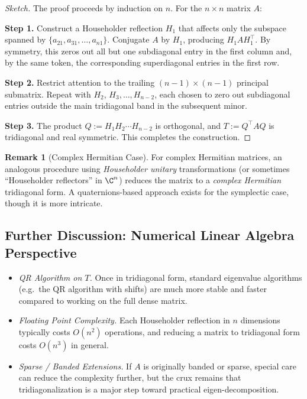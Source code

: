 \documentclass[letterpaper,11pt,oneside,reqno]{article}
\numberwithin{equation}{section}
\theoremstyle{definition}
\newtheorem{remark}[proposition]{Remark}
\begin{document}
\begin{proof}[Sketch]
The proof proceeds by induction on $n$. For the $n\times n$ matrix $A$:

\noindent
{\bf Step 1.} Construct a Householder reflection $H_1$ that affects only the subspace spanned by $\{a_{21},a_{31},\dots,a_{n1}\}$. Conjugate $A$ by $H_1$, producing $H_1 A H_1^\top$. By symmetry, this zeros out all but one subdiagonal entry in the first column and, by the same token, the corresponding superdiagonal entries in the first row.

\noindent
{\bf Step 2.} Restrict attention to the trailing $(n-1)\times(n-1)$ principal submatrix. Repeat with $H_2$, $H_3,\dots,H_{n-2}$, each chosen to zero out subdiagonal entries outside the main tridiagonal band in the subsequent minor.

\noindent
{\bf Step 3.} The product $Q := H_1 H_2 \cdots H_{n-2}$ is orthogonal, and $T := Q^\top A Q$ is tridiagonal and real symmetric. This completes the construction.
\end{proof}

\begin{remark}[Complex Hermitian Case]
For complex Hermitian matrices, an analogous procedure using \emph{Householder unitary} transformations (or sometimes “Householder reflectors” in $\C^n$) reduces the matrix to a \emph{complex Hermitian} tridiagonal form. A quaternions-based approach exists for the symplectic case, though it is more intricate.
\end{remark}

\subsection{Further Discussion: Numerical Linear Algebra Perspective}

\begin{itemize}
\item \emph{QR Algorithm on $T$.} Once in tridiagonal form, standard eigenvalue algorithms (e.g.\ the QR algorithm with shifts) are much more stable and faster compared to working on the full dense matrix.
\item \emph{Floating Point Complexity.} Each Householder reflection in $n$ dimensions typically costs $O(n^2)$ operations, and reducing a matrix to tridiagonal form costs $O(n^3)$ in general.
\item \emph{Sparse / Banded Extensions.} If $A$ is originally banded or sparse, special care can reduce the complexity further, but the crux remains that tridiagonalization is a major step toward practical eigen-decomposition.
\end{itemize}
\end{document}
